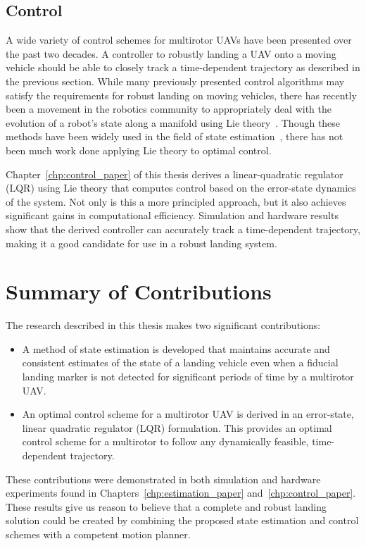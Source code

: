 \subsection{Control}
A wide variety of control schemes for multirotor UAVs have been presented over
the past two decades.
A controller to robustly landing a UAV onto a moving vehicle should be able to
closely track a time-dependent trajectory as described in the previous section.
While many previously presented control algorithms may satisfy the
requirements for robust landing on moving vehicles, there has recently been a
movement in the robotics community to appropriately deal with the evolution of a
robot's state along a manifold using Lie theory~\cite{sola2018micro}. Though
these methods have been widely used in the field of state
estimation~\cite{sola2017quaternion, koch2017relative}, there has not been much
work done applying Lie theory to optimal control.

Chapter~\ref{chp:control_paper} of this thesis derives a
linear-quadratic regulator (LQR) using Lie theory that computes control based on
the error-state dynamics of the system. Not only is this a more principled
approach, but it also achieves significant gains in computational efficiency.
Simulation and hardware results show that the derived controller can accurately
track a time-dependent trajectory, making it a good candidate for use in a
robust landing system.

\section{Summary of Contributions}
The research described in this thesis makes two significant contributions:
\begin{itemize}
\item A method of state estimation is developed that maintains accurate and
  consistent estimates of the state of a landing vehicle even when a fiducial landing
  marker is not detected for significant periods of time by a multirotor UAV.
\item An optimal control scheme for a multirotor UAV is derived in an error-state, linear
  quadratic regulator (LQR) formulation. This provides an optimal control scheme
  for a multirotor to follow any dynamically feasible, time-dependent
  trajectory.
\end{itemize}

These contributions were demonstrated in both simulation and hardware
experiments found in Chapters~\ref{chp:estimation_paper}
and~\ref{chp:control_paper}. These results give us reason to believe that a
complete and robust landing solution could be created by combining the proposed
state estimation and control schemes with a competent motion planner.

